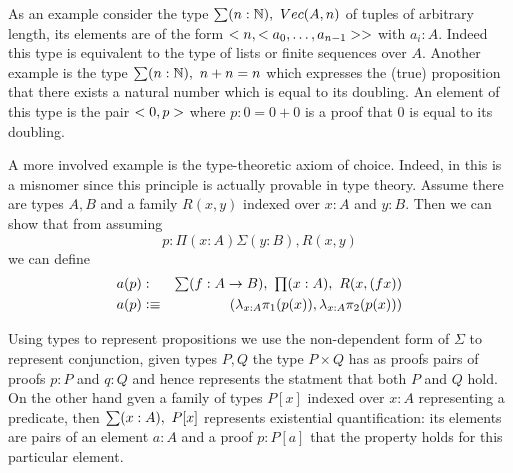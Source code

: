 

As an example consider the type $\sm{n:\Nat}\Vect(A,n)$ of tuples of
arbitrary length, its elements are of the form
$<n,<a_0,\dots,a_{n-1}>>$ with $a_i : A$. Indeed this type is
equivalent to the type of lists or finite sequences over $A$. Another example is the type
$\sm{n:\Nat}n+n = n$ which expresses the (true) proposition that
there exists a natural number which is equal to its doubling. An
element of this type is the pair $<0,p>$ where $p: 0 = 0+0$ is a
proof that $0$ is equal to its doubling.

A more involved example is the type-theoretic axiom of choice. Indeed,
in this is a misnomer since this principle is actually provable in
type theory. Assume
there are types $A,B$ and a family $R(x,y)$ indexed over $x:A$ and
$y:B$. Then we can show that from assuming 
\[p : \Pi(x:A)\Sigma(y :B),R(x,y)\] 
we can define 
\begin{eqnarray*}
a(p) & : & \sm{f : A \to B} \prd{x:A} R(x,(fx)) \\
a(p) & \defeq & (\lambda_{x:A} \pi_1(p(x)),\lambda_{x:A} \pi_2(p(x)))
\end{eqnarray*}

Using types to represent propositions we use the non-dependent
form of $\Sigma$ to represent conjunction, given types $P,Q$ the type
$P \times Q$ has as proofs pairs of proofs $p:P$ and $q:Q$ and hence
represents the statment that both $P$ and $Q$ hold. On the other hand
gven a family of types $P[x]$ indexed over $x:A$ representing a
predicate, then $\sm{x:A} P[x]$ represents existential quantification:
its elements are pairs of an element $a : A$ and a proof $p : P[a]$
that the property holds for this particular element.

